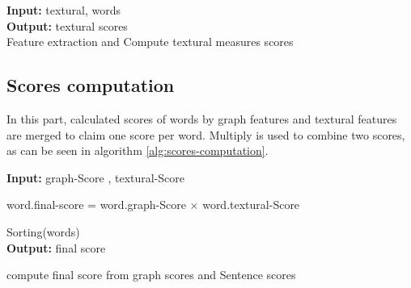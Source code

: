 \documentclass[3p]{elsarticle}
\begin{document}
\begin{algorithm}
    \SetAlgoLined
    \textbf{Input:} textural, words \\
    
    \textbf{Output:} textural scores\\
  
    \caption{Feature extraction and Compute textural measures scores}
    \label{alg:local-features}
\end{algorithm}
\subsection{Scores computation}
In this part, calculated scores of words by graph features and textural features are merged to claim one score per word. Multiply is used to combine two scores, as can be seen in algorithm \ref{alg:scores-computation}.

\begin{algorithm}
  \SetAlgoLined
  \textbf{Input:} graph-Score , textural-Score \\
  
   {

    word.final-score = word.graph-Score × word.textural-Score\\
}

Sorting(words)\\
\textbf{Output:} final score
 
 \caption{compute final score from graph scores and Sentence scores}
 \label{alg:scores-computation}
\end{algorithm}
\end{document}
